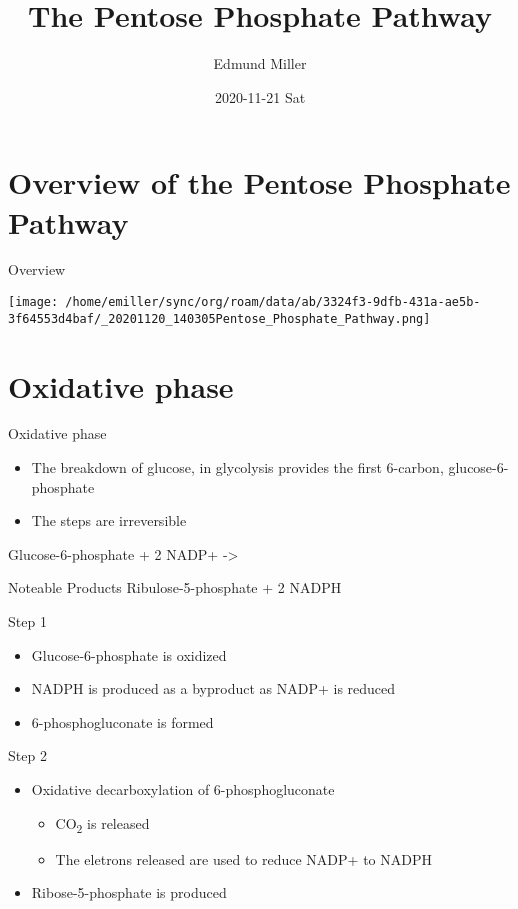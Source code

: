 \documentclass[bigger]{beamer}
\author{Edmund Miller}
\date{2020-11-21 Sat}
\title{The Pentose Phosphate Pathway}
\begin{document}
\maketitle


\section{Overview of the Pentose Phosphate Pathway}
\label{sec:orgebbb4b8}

\begin{frame}[label={sec:org4437bee}]{Overview}
\begin{center}
\texttt{[image: /home/emiller/sync/org/roam/data/ab/3324f3-9dfb-431a-ae5b-3f64553d4baf/\_20201120\_140305Pentose\_Phosphate\_Pathway.png]}
\end{center}
\end{frame}

\section{Oxidative phase}
\label{sec:orgfd95291}


\begin{frame}[label={sec:orgcd26751}]{Oxidative phase}
\begin{itemize}
\item The breakdown of glucose, in glycolysis provides the first 6-carbon,
glucose-6-phosphate
\item The steps are \alert{irreversible}
\end{itemize}

Glucose-6-phosphate + 2 NADP+ ->
\begin{block}{Noteable Products}
Ribulose-5-phosphate + 2 NADPH
\end{block}
\end{frame}

\begin{frame}[label={sec:org74ed4f3}]{Step 1}
\begin{itemize}
\item Glucose-6-phosphate is oxidized
\item NADPH is produced as a byproduct as NADP+ is reduced
\item 6-phosphogluconate is formed
\end{itemize}
\end{frame}

\begin{frame}[label={sec:org67d9f52}]{Step 2}
\begin{itemize}
\item Oxidative decarboxylation of 6-phosphogluconate
\begin{itemize}
\item CO\textsubscript{2} is released
\item The eletrons released are used to reduce NADP+ to NADPH
\end{itemize}
\item Ribose-5-phosphate is produced
\end{itemize}
\end{frame}
\end{document}
